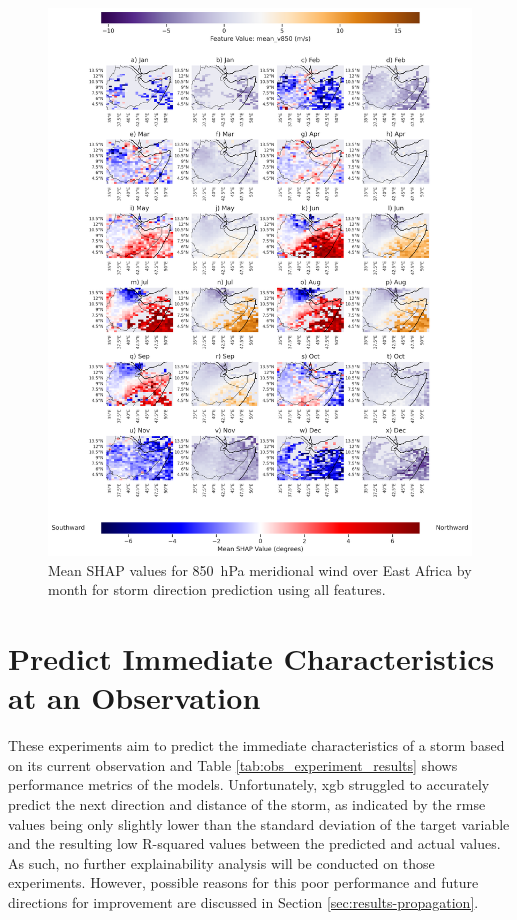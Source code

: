\begin{figure}[ht]
    \centering
    \includegraphics[width=\textwidth]{../figures/generated/experiments/storm_direction/geographic_corr/storm_direction_all_shap_mean_v850_map_by_month.png}
    \caption{Mean SHAP values for \SI{850}{\hecto\pascal} meridional wind over East Africa by month for storm direction prediction using all features.}
    \label{fig:storm_direction_all_shap_mean_v850_map_by_month}
\end{figure}

\clearpage
\section{Predict Immediate Characteristics at an Observation}

These experiments aim to predict the immediate characteristics of a storm based on its current observation and Table \ref{tab:obs_experiment_results} shows performance metrics of the models. Unfortunately, \acrshort{xgb} struggled to accurately predict the next direction and distance of the storm, as indicated by the \acrshort{rmse} values being only slightly lower than the standard deviation of the target variable and the resulting low R-squared values between the predicted and actual values. As such, no further explainability analysis will be conducted on those experiments. However, possible reasons for this poor performance and future directions for improvement are discussed in Section \ref{sec:results-propagation}.

